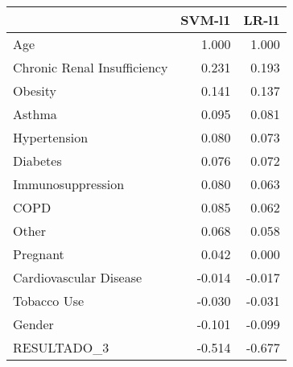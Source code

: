 \begin{tabular}{lrr}
\toprule
{} &  SVM-l1 &  LR-l1 \\
\midrule
Age                         &   1.000 &  1.000 \\
Chronic Renal Insufficiency &   0.231 &  0.193 \\
Obesity                     &   0.141 &  0.137 \\
Asthma                      &   0.095 &  0.081 \\
Hypertension                &   0.080 &  0.073 \\
Diabetes                    &   0.076 &  0.072 \\
Immunosuppression           &   0.080 &  0.063 \\
COPD                        &   0.085 &  0.062 \\
Other                       &   0.068 &  0.058 \\
Pregnant                    &   0.042 &  0.000 \\
Cardiovascular Disease      &  -0.014 & -0.017 \\
Tobacco Use                 &  -0.030 & -0.031 \\
Gender                      &  -0.101 & -0.099 \\
RESULTADO\_3                 &  -0.514 & -0.677 \\
\bottomrule
\end{tabular}
